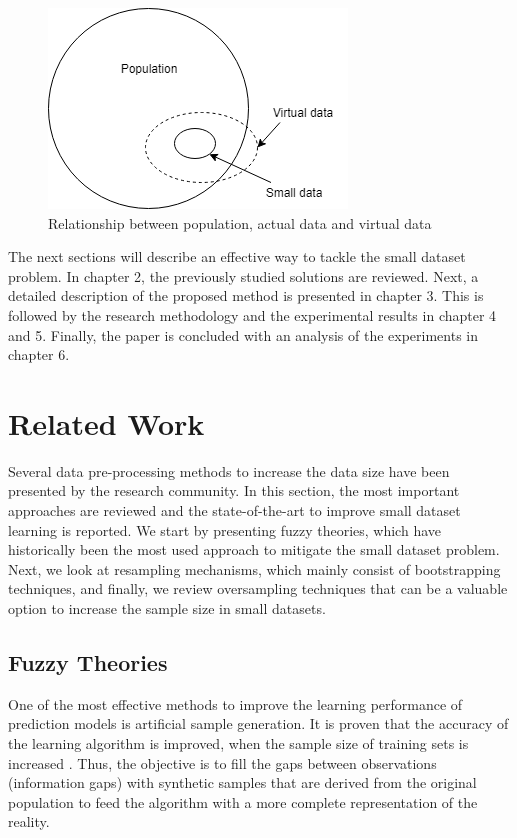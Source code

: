 \documentclass[parskip=full]{scrartcl}
\begin{document}
\begin{figure}[H]
	\centering
	\includegraphics[width=0.35\linewidth]{./resources/relationship}
	\caption{Relationship between population, actual data and virtual data \cite{Li.2006}}
	\label{fig:relationship}
\end{figure}

The next sections will describe an effective way to tackle the small dataset 
problem. In chapter 2, the previously studied solutions are reviewed. Next, a 
detailed description of the proposed method is presented in chapter 3. This is 
followed by the research methodology and the experimental results in chapter 4 
and 5. Finally, the paper is concluded with an analysis of the experiments in 
chapter 6.

\section{Related Work}
Several data pre-processing methods to increase the data size have been
presented by the research community. In this section, the most important
approaches are reviewed and the state-of-the-art to improve small dataset
learning is reported. We start by presenting fuzzy theories, which have 
historically been the most used approach to mitigate the small dataset problem. 
Next, we look at resampling mechanisms, which mainly consist of bootstrapping 
techniques, and finally, we review oversampling techniques that can be a 
valuable option to increase the sample size in small datasets.

\subsection{Fuzzy Theories}

One of the most effective methods to improve the learning performance of 
prediction models is artificial sample generation. It is proven that the 
accuracy of the learning algorithm is improved, when the sample size of 
training sets is increased \cite{AbdulLateh.2017}. Thus, the objective is to 
fill the gaps between observations (information gaps) with synthetic samples 
that are derived from the original population to feed the algorithm with a more 
complete representation of the reality.
\end{document}
